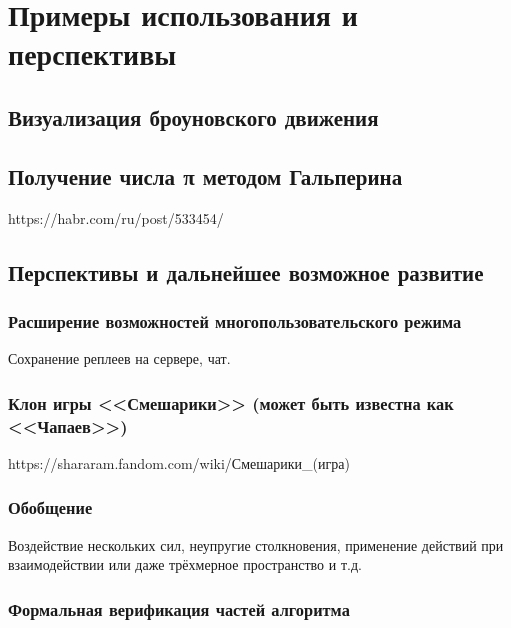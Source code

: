 \chapter{Примеры использования и перспективы}

\TODO

\section{Визуализация броуновского движения}

\TODO

\section{Получение числа π методом Гальперина}

\TODO https://habr.com/ru/post/533454/

\section{Перспективы и дальнейшее возможное развитие}

\subsection{Расширение возможностей многопользовательского режима}

\TODO Сохранение реплеев на сервере, чат.

\subsection{Клон игры <<Смешарики>> (может быть известна как <<Чапаев>>)}

\TODO https://shararam.fandom.com/wiki/Смешарики\_(игра)

\subsection{Обобщение \TODO}

\TODO Воздействие нескольких сил, неупругие столкновения,
применение действий при взаимодействии или даже трёхмерное пространство и т.д.

\subsection{Формальная верификация частей алгоритма}

\TODO
